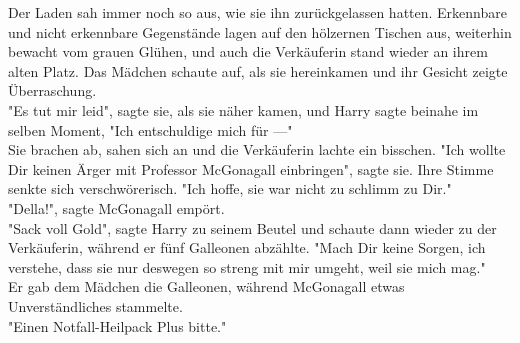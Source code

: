 {Der Laden sah immer noch so aus, wie sie ihn zurückgelassen hatten. Erkennbare und nicht erkennbare Gegenstände lagen auf den hölzernen Tischen aus, weiterhin bewacht vom grauen Glühen, und auch die Verkäuferin stand wieder an ihrem alten Platz. Das Mädchen schaute auf, als sie hereinkamen und ihr Gesicht zeigte Überraschung.\\ "Es tut mir leid", sagte sie, als sie näher kamen, und Harry sagte beinahe im selben Moment, "Ich entschuldige mich für ---"\\ Sie brachen ab, sahen sich an und die Verkäuferin lachte ein bisschen. "Ich wollte Dir keinen Ärger mit Professor McGonagall einbringen", sagte sie. Ihre Stimme senkte sich verschwörerisch. "Ich hoffe, sie war nicht zu schlimm zu Dir."\\ "Della!", sagte McGonagall empört.\\ "Sack voll Gold", sagte Harry zu seinem Beutel und schaute dann wieder zu der Verkäuferin, während er fünf Galleonen abzählte. "Mach Dir keine Sorgen, ich verstehe, dass sie nur deswegen so streng mit mir umgeht, weil sie mich mag."\\ Er gab dem Mädchen die Galleonen, während McGonagall etwas Unverständliches stammelte.\\ "Einen Notfall-Heilpack Plus bitte."

}
